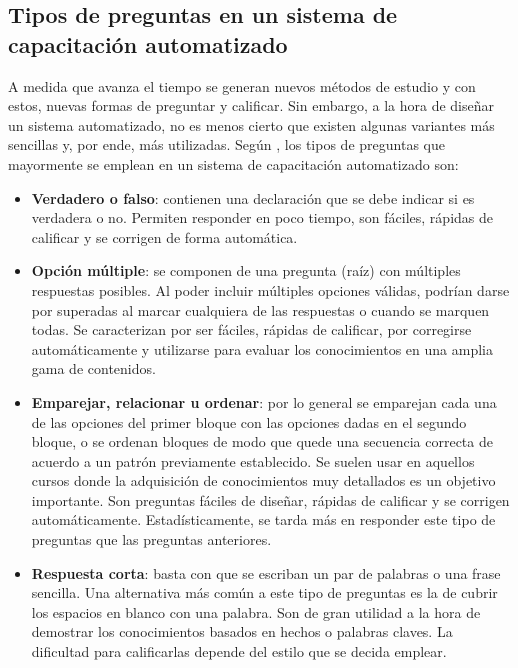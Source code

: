 \subsection{Tipos de preguntas en un sistema de capacitación automatizado}
A medida que avanza el tiempo se generan nuevos métodos de estudio y con estos, nuevas formas de preguntar y calificar. Sin embargo, a la hora de diseñar un sistema automatizado, no es menos cierto que existen algunas variantes más sencillas y, por ende, más utilizadas. Según \cite{Laguna2016}, los tipos de preguntas que mayormente se emplean en un sistema de capacitación automatizado son:

\begin{itemize}
\item \textbf{Verdadero o falso}: contienen una declaración que se debe indicar si es verdadera o no. Permiten responder en poco tiempo, son fáciles, rápidas de calificar y se corrigen de forma automática.
\item \textbf{Opción múltiple}: se componen de una pregunta (raíz) con múltiples respuestas posibles. Al poder incluir múltiples opciones válidas, podrían darse por superadas al marcar cualquiera de las respuestas o cuando se marquen todas. Se caracterizan por ser fáciles, rápidas de calificar, por corregirse automáticamente y utilizarse para evaluar los conocimientos en una amplia gama de contenidos.
\item \textbf{Emparejar, relacionar u ordenar}: por lo general se emparejan cada una de las opciones del primer bloque con las opciones dadas en el segundo bloque, o se ordenan bloques de modo que quede una secuencia correcta de acuerdo a un patrón previamente establecido. Se suelen usar en aquellos cursos donde la adquisición de conocimientos muy detallados es un objetivo importante. Son preguntas fáciles de diseñar, rápidas de calificar y se corrigen automáticamente. Estadísticamente, se tarda más en responder este tipo de preguntas que las preguntas anteriores.
\item \textbf{Respuesta corta}: basta con que se escriban un par de palabras o una frase sencilla. Una alternativa más común a este tipo de preguntas es la de cubrir los espacios en blanco con una palabra. Son de gran utilidad a la hora de demostrar los conocimientos basados en hechos o palabras claves. La dificultad para calificarlas depende del estilo que se decida emplear.
\end{itemize}

